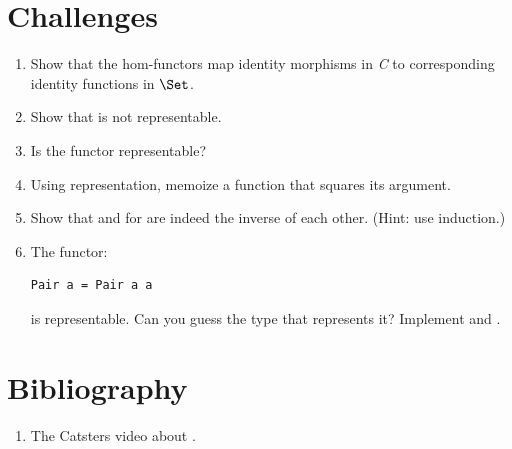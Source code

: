 \section{Challenges}

\begin{enumerate}
\tightlist
\item
  Show that the hom-functors map identity morphisms in \emph{C} to
  corresponding identity functions in $\Set$.
\item
  Show that  is not representable.
\item
  Is the  functor representable?
\item
  Using  representation, memoize a function that squares
  its argument.
\item
  Show that  and  for  are
  indeed the inverse of each other. (Hint: use induction.)
\item
  The functor:

\begin{Verbatim}
Pair a = Pair a a
\end{Verbatim}
  is representable. Can you guess the type that represents it? Implement
   and .
\end{enumerate}

\section{Bibliography}

\begin{enumerate}
\tightlist
\item
  The Catsters video about
  .
\end{enumerate}